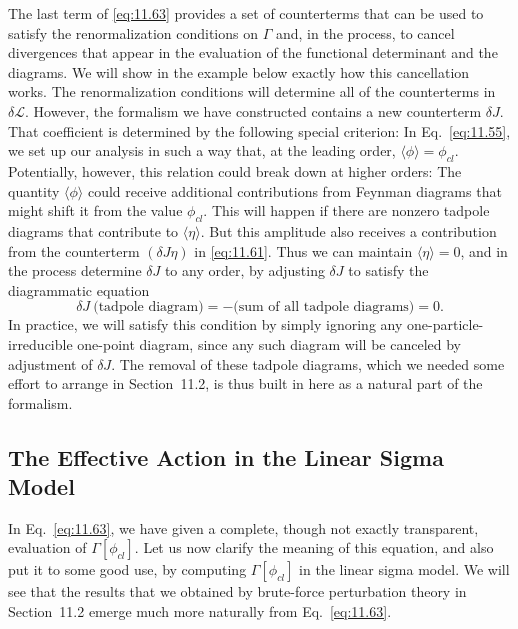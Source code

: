 The last term of \eqref{eq:11.63} provides a set of counterterms that can be
used to satisfy the renormalization conditions on $\Gamma$ and, in the
process, to cancel divergences that appear in the evaluation of the functional
determinant and the diagrams.  We will show in the example below exactly how
this cancellation works.  The renormalization conditions will determine all of
the counterterms in $\delta\mathcal{L}$.  However, the formalism we have
constructed contains a new counterterm $\delta J$.  That coefficient is
determined by the following special criterion: In Eq.~\eqref{eq:11.55}, we
set up our analysis in such a way that, at the leading order,
$\langle\phi\rangle = \phi_{cl}$.  Potentially, however, this relation could
break down at higher orders: The quantity $\langle\phi\rangle$ could receive
additional contributions from Feynman diagrams that might shift it from the
value $\phi_{cl}$.  This will happen if there are nonzero tadpole diagrams
that contribute to $\langle\eta\rangle$.  But this amplitude also receives a
contribution from the counterterm $(\delta J\eta)$ in \eqref{eq:11.61}.  Thus
we can maintain $\langle\eta\rangle = 0$, and in the process determine
$\delta J$ to any order, by adjusting $\delta J$ to satisfy the diagrammatic
equation
\begin{equation}
  \delta J\ \bigl( \text{tadpole diagram} \bigr)
  = -\bigl( \text{sum of all tadpole diagrams} \bigr) = 0 .
  \label{eq:11.64}
\end{equation}
In practice, we will satisfy this condition by simply ignoring any
one-particle-irreducible one-point diagram, since any such diagram will be
canceled by adjustment of $\delta J$.  The removal of these tadpole diagrams,
which we needed some effort to arrange in Section~11.2, is thus built in here
as a natural part of the formalism.

\subsection{The Effective Action in the Linear Sigma Model}

In Eq.~\eqref{eq:11.63}, we have given a complete, though not exactly
transparent, evaluation of $\Gamma[\phi_{cl}]$.  Let us now clarify the
meaning of this equation, and also put it to some good use, by computing
$\Gamma[\phi_{cl}]$ in the linear sigma model.  We will see that the results
that we obtained by brute-force perturbation theory in Section~11.2 emerge
much more naturally from Eq.~\eqref{eq:11.63}.

